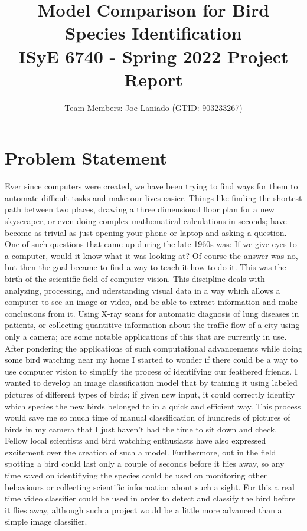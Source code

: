 \documentclass[11pt]{article}
\title{%
Model Comparison for Bird Species Identification\\
  \large ISyE 6740 - Spring 2022 Project Report}
\author{Team Members: Joe Laniado (GTID: 903233267)}
\begin{document}
\begin{singlespace}
\begin{titlepage}
\maketitle

\end{titlepage}
\tableofcontents
\clearpage

\section{Problem Statement}
Ever since computers were created, we have been trying to find ways for them to automate difficult tasks and make our lives easier. Things like finding the shortest path between two places, drawing a three dimensional floor plan for a new skyscraper, or even doing complex mathematical calculations in seconds; have become as trivial as just opening your phone or laptop and asking a question. One of such questions that came up during the late 1960s was: If we give eyes to a computer, would it know what it was looking at? 
Of course the answer was no, but then the goal became to find a way to teach it how to do it. This was the birth of the scientific field of computer vision. This discipline deals with analyzing, processing, and uderstanding visual data in a way which allows a computer to see an image or video, and be able to extract information and make conclusions from it. Using X-ray scans for automatic diagnosis of lung diseases in patients, or collecting quantitive information about the traffic flow of a city using only a camera; are some notable applications of this that are currently in use. \\

After pondering the applications of such computational advancements while doing some bird watching near my home I started to wonder if there could be a way to use computer vision to simplify the process of identifying our feathered friends. I wanted to develop an image classification model that by training it using labeled pictures of different types of birds; if given new input, it could correctly identify which species the new birds belonged to in a quick and efficient way. This process would save me so much time of manual classification of hundreds of pictures of birds in my camera that I just haven't had the time to sit down and check. Fellow local scientists and bird watching enthusiasts have also expressed excitement over the creation of such a model. Furthermore, out in the field spotting a bird could last only a couple of seconds before it flies away, so any time saved on identifiying the species could be used on monitoring other behaviours or collecting scientific information about such a sight. For this a real time video classifier could be used in order to detect and classify the bird before it flies away, although such a project would be a little more advanced than a simple image classifier. \\


\end{singlespace}
\end{document}
